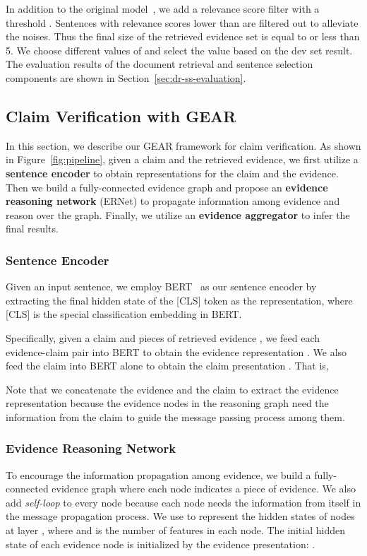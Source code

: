 \documentclass[11pt,a4paper]{article}
\begin{document}
In addition to the original model~\cite{hanselowski2018ukp}, we add a relevance score filter with a threshold . Sentences with relevance scores lower than  are filtered out to alleviate the noises. Thus the final size of the retrieved evidence set is equal to or less than 5.
We choose different values of  and select the value based on the dev set result. The evaluation results of the document retrieval and sentence selection components are shown in Section~\ref{sec:dr-ss-evaluation}.

\subsection{Claim Verification with GEAR}

In this section, we describe our GEAR framework for claim verification. As shown in Figure~\ref{fig:pipeline}, given a claim and the retrieved evidence, we first utilize a \textbf{sentence encoder} to obtain representations for the claim and the evidence. Then we build a fully-connected evidence graph and propose an \textbf{evidence reasoning network} (ERNet) to propagate information among evidence and reason over the graph. Finally, we utilize an \textbf{evidence aggregator} to infer the final results.

\subsubsection*{Sentence Encoder} 
Given an input sentence, we employ BERT~\cite{devlin2018bert} as our sentence encoder by extracting the final hidden state of the [CLS] token as the representation, where [CLS] is the special classification embedding in BERT.

Specifically, given a claim  and  pieces of retrieved evidence , we feed each evidence-claim pair  into BERT to obtain the evidence representation . We also feed the claim into BERT alone to obtain the claim presentation . That is,


Note that we concatenate the evidence and the claim to extract the evidence representation because the evidence nodes in the reasoning graph need the information from the claim to guide the message passing process among them.


\subsubsection*{Evidence Reasoning Network}
To encourage the information propagation among evidence, we build a fully-connected evidence graph where each node indicates a piece of evidence. We also add \emph{self-loop} to every node because each node needs the information from itself in the message propagation process. We use  to represent the hidden states of nodes at layer , where  and  is the number of features in each node. The initial hidden state of each evidence node  is initialized by the evidence presentation: .
\end{document}
